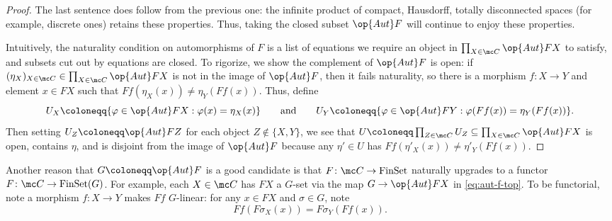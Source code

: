 \documentclass{amsart}
\begin{document}
\begin{proof}
    The last sentence does follow from the previous one: the infinite product of compact, Hausdorff, totally disconnected spaces (for example, discrete ones) retains these properties. Thus, taking the closed subset $\op{Aut}F$ will continue to enjoy these properties.

    Intuitively, the naturality condition on automorphisms of $F$ is a list of equations we require an object in $\prod_{X\in\mc C}\op{Aut}FX$ to satisfy, and subsets cut out by equations are closed. To rigorize, we show the complement of $\op{Aut}F$ is open: if $(\eta_X)_{X\in\mc C}\in\prod_{X\in\mc C}\op{Aut}FX$ is not in the image of $\op{Aut}F$, then it fails naturality, so there is a morphism $f\colon X\to Y$ and element $x\in FX$ such that $Ff(\eta_X(x))\ne\eta_Y(Ff(x))$. Thus, define
    \[U_X\coloneqq\{\varphi\in\op{Aut}FX:\varphi(x)=\eta_X(x)\}\qquad\text{and}\qquad U_Y\coloneqq\{\varphi\in\op{Aut}FY:\varphi(Ff(x))=\eta_Y(Ff(x))\}.\]
    Then setting $U_Z\coloneqq\op{Aut}FZ$ for each object $Z\notin\{X,Y\}$, we see that $U\coloneqq\prod_{Z\in\mc C}U_Z\subseteq\prod_{X\in\mc C}\op{Aut}FX$ is open, contains $\eta$, and is disjoint from the image of $\op{Aut}F$ because any $\eta'\in U$ has $Ff(\eta'_X(x))\ne\eta'_Y(Ff(x))$.
\end{proof}
\begin{remark} \label{rem:f-maps-to-g-set}
    Another reason that $G\coloneqq\op{Aut}F$ is a good candidate is that $F\colon\mc C\to\mathrm{FinSet}$ naturally upgrades to a functor $F\colon\mc C\to\mathrm{FinSet}(G)$. For example, each $X\in\mc C$ has $FX$ a $G$-set via the map $G\to\op{Aut}FX$ in \eqref{eq:aut-f-top}. To be functorial, note a morphism $f\colon X\to Y$ makes $Ff$ $G$-linear: for any $x\in FX$ and $\sigma\in G$, note
    \[Ff(F\sigma_X(x))=F\sigma_Y(Ff(x)).\]
\end{remark}
\end{document}
